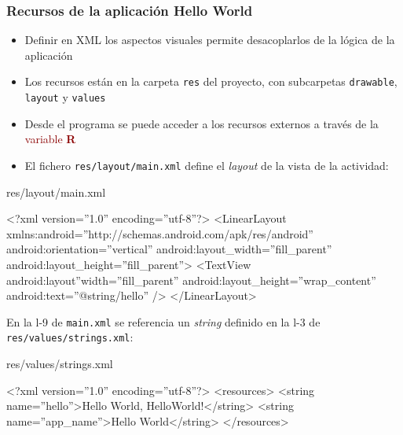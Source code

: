 \documentclass[hyperref={pdfpagelabels=true},utf8x]{beamer}
\newcommand{\res}[1]{\textcolor{darkred}{#1}}
\newcommand{\dif}{\textsl}
\newcommand{\com}[1]{\textrm{\textbf{#1}}}
\begin{document}
\begin{frame}[fragile,shrink=17.18]
\frametitle{Recursos de la aplicación Hello World}

\begin{itemize}
\item Definir en XML los aspectos visuales permite desacoplarlos de la
  lógica de la aplicación
\item Los recursos están en la carpeta \verb|res| del proyecto, con
  subcarpetas \verb|drawable|, \verb|layout| y \verb|values|
\item Desde el programa se puede acceder a los recursos externos a
  través de la \res{variable \com{R}}
\item El fichero \verb|res/layout/main.xml| define el \dif{layout} de
  la vista de la actividad:
\end{itemize}

\begin{block}{res/layout/main.xml}
\begin{tiny}
\begin{xml}
<?xml version=''1.0'' encoding=''utf-8''?> 
<LinearLayout xmlns:android=''http://schemas.android.com/apk/res/android''
  android:orientation=''vertical''
  android:layout_width=''fill_parent''
  android:layout_height=''fill_parent''> 
  <TextView  
    android:layout''width=''fill_parent'' 
    android:layout_height=''wrap_content''
    android:text=''@string/hello''
  /> 
</LinearLayout> 
\end{xml}
\end{tiny}
\end{block}

En la l-9 de \verb|main.xml| se referencia un \dif{string} definido en la l-3 de \verb|res/values/strings.xml|:

\begin{block}{res/values/strings.xml}
\begin{tiny}
\begin{xml}
<?xml version=''1.0'' encoding=''utf-8''?>
<resources>
  <string name=''hello''>Hello World, HelloWorld!</string>
  <string name=''app_name''>Hello World</string>
</resources>
\end{xml}
\end{tiny}
\end{block}


\end{frame}
\end{document}
